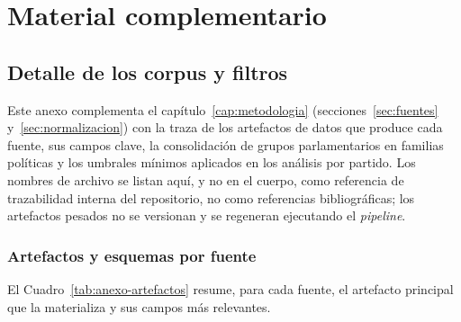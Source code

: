 \chapter{Material complementario}
\label{anexo:a}


\section{Detalle de los corpus y filtros}
\label{anexo:corpus}

Este anexo complementa el capítulo~\ref{cap:metodologia}
(secciones~\ref{sec:fuentes} y~\ref{sec:normalizacion}) con la traza de los
artefactos de datos que produce cada fuente, sus campos clave, la consolidación
de grupos parlamentarios en familias políticas y los umbrales mínimos aplicados
en los análisis por partido. Los nombres de archivo se listan aquí, y no en el
cuerpo, como referencia de trazabilidad interna del repositorio, no como
referencias bibliográficas; los artefactos pesados no se versionan y se
regeneran ejecutando el \emph{pipeline}.

\subsection*{Artefactos y esquemas por fuente}

El Cuadro~\ref{tab:anexo-artefactos} resume, para cada fuente, el artefacto
principal que la materializa y sus campos más relevantes.

